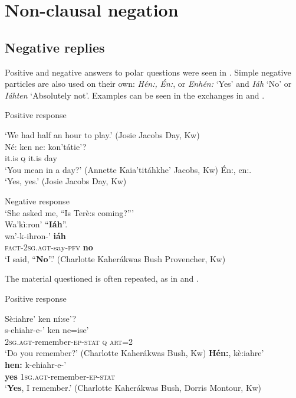 \documentclass[output=paper,colorlinks,citecolor=brown]{langscibook}
\begin{document}
\section{Non-clausal negation}\label{sec:moh:3}

\subsection{Negative replies}\label{sec:moh:3.1}

Positive and negative answers to polar questions were seen in . Simple negative particles are also used on their own: \textit{Hén:,} \textit{Én:}, or \textit{Enhén:} ‘Yes’ and \textit{Iáh} ‘No’ or \textit{Iáhten} ‘Absolutely not’. Examples can be seen in the exchanges in  and .

{\ea\label{ex:moh:61}Positive response
\begin{xlist}[AKJ:]
    \label{ex:moh:61a}
        \glt  ‘We had half an hour to play.’ (Josie Jacobs Day, Kw)\\
    \label{ex:moh:61b}\medskip
        \gll Né: ken ne: kon’tátie’? \\
             it.is \textsc{q} it.is day \\
        \glt ‘You mean in a day?’ (Annette Kaia’titáhkhe’ Jacobs, Kw)
    \label{ex:moh:61c}\medskip
        \gl Én:, en:.\\
        \glt ‘Yes, yes.’ (Josie Jacobs Day, Kw)
\end{xlist}
\z}

\ea\label{ex:moh:62}Negative response\\
    \glt ‘She asked me, “Is Terè:s coming?”’\\ \medskip
    \glll Wa’kì:ron’  “\textbf{Iáh}”. \\ 
          wa’-k-ihron-’ \textbf{iáh} \\
          \textsc{fact-2sg.agt}-say-\textsc{pfv} \textbf{no} \\
    \glt ‘I said, “\textbf{No}”.’ (Charlotte Kaherákwas Bush Provencher, Kw)
\z

The material questioned is often repeated, as in  and .

\newpage
{\ea\label{ex:moh:63}Positive response\\
\begin{xlist}[DMM:]
    \label{ex:moh:63a}
        \glll Sè:iahre’ ken ní:se’? \\
             s-ehiahr-e-’ ken ne=ise’ \\
         \textsc{2sg.agt}-remember-\textsc{ep-stat} \textsc{q} \textsc{art=2}\\
        \glt ‘Do you remember?’ (Charlotte Kaherákwas Bush, Kw)
    \label{ex:moh:63b}\medskip
        \glll \textbf{Hén:}, kè:iahre’ \\
             \textbf{hen:} k-ehiahr-e-’ \\
             \textbf{yes} \textsc{1sg.agt}-remember-\textsc{ep-stat} \\
        \glt ‘\textbf{Yes}, I remember.’ (Charlotte Kaherákwas Bush, Dorris Montour, Kw)
\end{xlist} 
\z}
\end{document}
